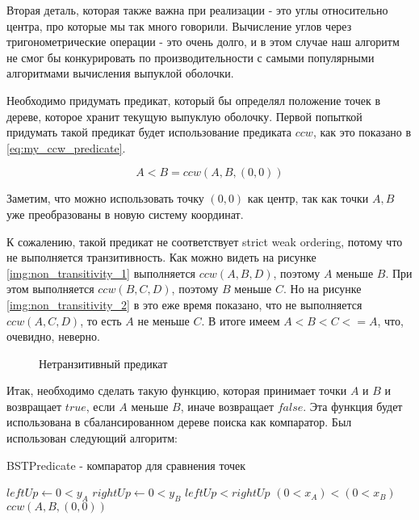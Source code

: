 Вторая деталь, которая также важна при реализации - это углы относительно центра, про которые мы так много говорили. Вычисление углов через тригонометрические операции - это очень долго, и в этом случае наш алгоритм не смог бы конкурировать по производительности с самыми популярными алгоритмами вычисления выпуклой оболочки.

Необходимо придумать предикат, который бы определял положение точек в дереве, которое хранит текущую выпуклую оболочку. Первой попыткой придумать такой предикат будет использование предиката $ccw$, как это показано в \ref{eq:my_ccw_predicate}.

\begin{equation}\label{eq:my_ccw_predicate}
A<B=ccw(A, B, (0, 0))
\end{equation}

Заметим, что можно использовать точку $(0, 0)$ как центр, так как точки $A, B$ уже преобразованы в новую систему координат.

К сожалению, такой предикат не соответствует strict weak ordering, потому что не выполняется транзитивность. Как можно видеть на рисунке \ref{img:non_transitivity_1} выполняется $ccw(A, B, D)$, поэтому $A$ меньше $B$. При этом выполняется $ccw(B, C, D)$, поэтому $B$ меньше $C$. Но на рисунке \ref{img:non_transitivity_2} в это еже время показано, что не выполняется $ccw(A, C, D)$, то есть $A$ не меньше $C$. В итоге имеем $A < B < C <= A$, что, очевидно, неверно.

\begin{figure}[H]
	{\centering
		\hfill
		\subbottom[\label{img:non_transitivity_1}]{%
			}
		\hfill
		\subbottom[\label{img:non_transitivity_2}]{%
			}
		\hfill
	}
	\caption{Нетранзитивный предикат}
	\label{img:non_transitivity}
\end{figure}

Итак, необходимо сделать такую функцию, которая принимает точки $A$ и $B$ и возвращает $true$, если $A$ меньше $B$, иначе возвращает $false$. Эта функция будет использована в сбалансированном дереве поиска как компаратор. Был использован следующий алгоритм:

\begin{algorithm}[H]
	\caption{BSTPredicate - компаратор для сравнения точек}
	\label{alg:bst_predicate}
	\begin{algorithmic}[1]
		\State $leftUp \gets 0<y_A$
		\State $rightUp \gets 0<y_B$
			\Return $leftUp < rightUp$
		\EndIf
			\Return $(0<x_A) < (0<x_B)$
		\EndIf
		\Return $ccw(A, B, (0, 0))$
		\EndProcedure
	\end{algorithmic}
\end{algorithm}

